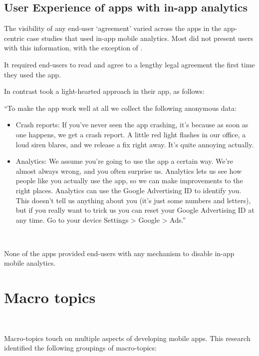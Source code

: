 \subsection{User Experience of apps with in-app analytics}
The visibility of any end-user `agreement' varied across the apps in the app-centric case studies that used in-app mobile analytics. Most did not present users with this information, with the exception of .

It required end-users to read and agree to a lengthy legal agreement the first time they used the app. 

In contrast  took a light-hearted approach in their app, as follows: 

\begin{kaobox}[frametitle=Moodspace privacy policy]
``To make the app work well at all we collect the following anonymous data:
\begin{itemize}
    \item Crash reports: If you've never seen the app crashing, it's because as soon as one happens, we get a crash report. A little red light flashes in our office, a loud siren blares, and we release a fix right away. It's quite annoying actually.
    \item Analytics: We assume you're going to use the app a certain way. We're almost always wrong, and you often surprise us. Analytics lets us see how people like you actually use the app, so we can make improvements to the right places. Analytics can use the Google Advertising ID to identify you. This doesn't tell us anything about you (it's just some numbers and letters), but if you really want to trick us you can reset your Google Advertising ID at any time. Go to your device Settings > Google > Ads.''
\end{itemize}~
\end{kaobox}

None of the apps provided end-users with any mechanism to disable in-app mobile analytics.

\section{Macro topics}~\label{aata-macro-topics}

Macro-topics touch on multiple aspects of developing mobile apps. This research identified the following groupings of macro-topics:

